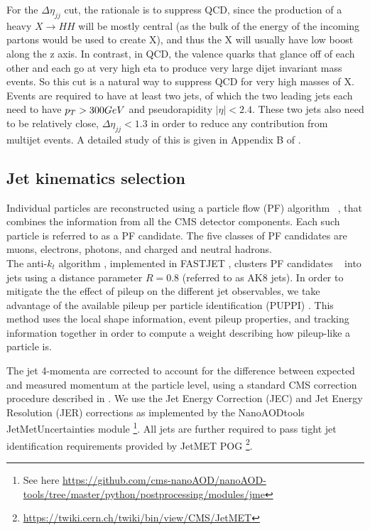 For the $\Delta \eta_{jj}$ cut, the rationale is to suppress QCD, since the production of a heavy $X \to HH$ will be mostly central (as the bulk of the energy of the incoming partons would be used to create X), and thus the X will usually have low boost along the z axis. In contrast, in QCD, the valence quarks that glance off of each other and each go at very high eta to produce very large dijet invariant mass events. So this cut is a natural way to suppress QCD for very high masses of X. Events are required to have at least two jets, of which the two leading jets each need to have $p_{T} > 300 GeV$ and pseudorapidity $|\eta| < 2.4$. These two jets also need to be relatively close, $\Delta \eta_{jj} < 1.3$ in order to reduce any contribution from multijet events. A detailed study of this is given in Appendix B of \cite{CMS-PAS-B2G-16-026}.

\subsection{Jet kinematics selection\label{ss:JetSel}}

Individual particles are reconstructed using a particle flow (PF) algorithm ~\cite{PFPAS2009,CMS-PAS-PFT-10-001}, that combines the information from all the CMS detector components. Each such particle is referred to as a PF candidate. The five classes of PF candidates are muons, electrons, photons, and charged and neutral hadrons. \\

The anti-$k_t$ algorithm \cite{antiKtAlgorithm}, implemented in FASTJET \cite{Cacciari:2011ma}, clusters PF candidates ~\cite{PFPAS2009,CMS-PAS-PFT-10-001} into jets using a distance parameter $R = 0.8$ (referred to as AK8 jets). In order to mitigate the the effect of pileup on the different jet observables, we take advantage of the available pileup per particle identification (PUPPI) \cite{puppi}. This method uses the local shape information, event pileup properties, and tracking information together in order to compute a weight describing how pileup-like a particle is. 

The jet 4-momenta are corrected to account for the difference between expected and measured momentum at the particle level, using a standard CMS correction procedure described in \cite{CMS-PAS-JME-10-003}. We use the Jet Energy Correction (JEC) and Jet Energy Resolution (JER) corrections as implemented by the NanoAODtools JetMetUncertainties module \footnote{See here \url{https://github.com/cms-nanoAOD/nanoAOD-tools/tree/master/python/postprocessing/modules/jme}}.  All jets are further required to pass tight jet identification requirements provided by JetMET POG \footnote{\url{https://twiki.cern.ch/twiki/bin/view/CMS/JetMET}}.

